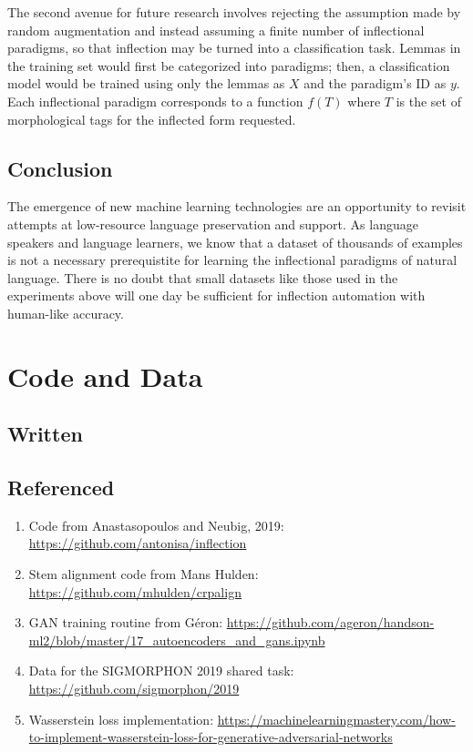\documentclass{article}
\begin{document}
      The second avenue for future research involves rejecting the assumption made by random augmentation and instead assuming a finite number of inflectional paradigms, so that inflection may be turned into a classification task. Lemmas in the training set would first be categorized into paradigms; then, a classification model would be trained using only the lemmas as $X$ and the paradigm's ID as $y$. Each inflectional paradigm corresponds to a function $f(T)$ where $T$ is the set of morphological tags for the inflected form requested.

    \subsection{Conclusion}
      The emergence of new machine learning technologies are an opportunity to revisit attempts at low-resource language preservation and support. As language speakers and language learners, we know that a dataset of thousands of examples is not a necessary prerequistite for learning the inflectional paradigms of natural language. There is no doubt that small datasets like those used in the experiments above will one day be sufficient for inflection automation with human-like accuracy. 

    \section*{Code and Data}
    \subsection*{Written}
    \subsection*{Referenced}
    \begin{enumerate}
      \item Code from Anastasopoulos and Neubig, 2019: \url{https://github.com/antonisa/inflection}
      \item Stem alignment code from Mans Hulden: \url{https://github.com/mhulden/crpalign}
      \item GAN training routine from Géron: \url{https://github.com/ageron/handson-ml2/blob/master/17_autoencoders_and_gans.ipynb}
      \item Data for the SIGMORPHON 2019 shared task: \url{https://github.com/sigmorphon/2019}
      \item Wasserstein loss implementation: \url{https://machinelearningmastery.com/how-to-implement-wasserstein-loss-for-generative-adversarial-networks}
    \end{enumerate}
  
\end{document}
